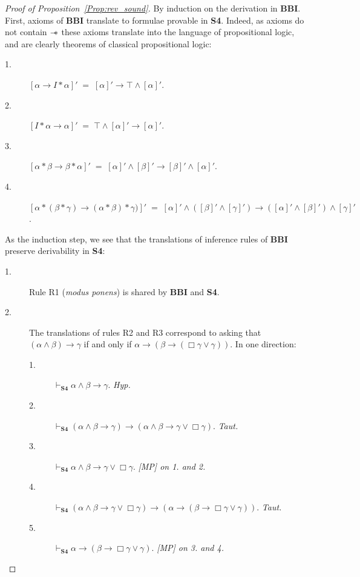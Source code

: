 \documentclass[a4paper]{article}
\newcommand\magicwand{\mathrel{-\mkern-6mu*}}
\newcommand{\BBI}{\textbf{BBI}\xspace}
\newcommand{\SFour}{\textbf{S4}\xspace}
\begin{document}
\begin{proof}[Proof of Proposition~\ref{Prop:rev_sound}]
    By induction on the derivation in \BBI. First, axioms of \BBI translate to formulae provable in \SFour. Indeed, as axioms do not contain $\magicwand$ these axioms translate into the language of propositional logic, and are clearly theorems of classical propositional logic:

  \begin{description}

   \item[1.] $[\alpha \rightarrow I*\alpha]' \;=\; [\alpha]' \rightarrow \top\land[\alpha]'$.

    \item[2.] $[I*\alpha \rightarrow \alpha]' \;=\; \top \land [\alpha]' \rightarrow [\alpha]'$.

    \item[3.] $[\alpha*\beta\rightarrow\beta*\alpha]' \;=\; [\alpha]' \land [\beta]'\rightarrow[\beta]' \land [\alpha]'$.

    \item[4.] $[\alpha*(\beta*\gamma) \rightarrow (\alpha *\beta) * \gamma)]' \;=\; [\alpha]' \land ([\beta]' \land [\gamma]') \rightarrow ([\alpha]' \land [\beta]') \land [\gamma]'$.



  \end{description}

    As the induction step, we see that the translations of inference rules of \BBI preserve derivability in \SFour:

\begin{description}

    \item[1.] Rule R1 (\textit{modus ponens}) is shared by \BBI and \SFour.

\item[2.] The translations of rules R2 and R3 correspond to asking that $(\alpha \land \beta)\rightarrow\gamma$ if and only if $\alpha \rightarrow (\beta \rightarrow (\Box \gamma \lor \gamma))$. In one direction:
\begin{description}
    \item[1.] $\vdash_{\SFour}\alpha \land \beta \rightarrow \gamma$.\textit{ Hyp.}
    \item[2.] $\vdash_{\SFour}(\alpha \land \beta \rightarrow \gamma) \rightarrow (\alpha \land \beta \rightarrow \gamma \lor \Box \gamma)$. \textit{Taut.}
    \item[3.] $\vdash_{\SFour}\alpha \land \beta \rightarrow \gamma \lor \Box \gamma$. \textit{[MP] on 1. and 2.}
    \item[4.] $\vdash_{\SFour}(\alpha \land \beta \rightarrow \gamma \lor \Box \gamma) \rightarrow (\alpha \rightarrow (\beta \rightarrow \Box \gamma \lor \gamma))$. \textit{Taut.}
    \item[5.] $\vdash_{\SFour}\alpha \rightarrow (\beta \rightarrow \Box \gamma \lor \gamma)$. \textit{[MP] on 3. and 4.}
    

\end{description}
\end{description}
\end{proof}
\end{document}
